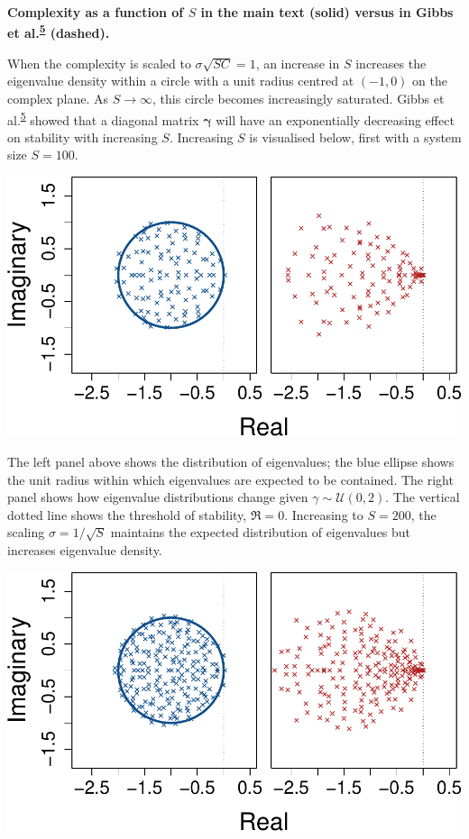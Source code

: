 \documentclass[]{article}
\begin{document}
\textbf{Complexity as a function of \(S\) in the main text (solid)
versus in Gibbs et
al.\textsuperscript{\protect\hyperlink{ref-Gibbs2017}{5}} (dashed).}

When the complexity is scaled to \(\sigma\sqrt{SC} = 1\), an increase in
\(S\) increases the eigenvalue density within a circle with a unit
radius centred at \((-1, 0)\) on the complex plane. As \(S \to \infty\),
this circle becomes increasingly saturated. Gibbs et
al.\textsuperscript{\protect\hyperlink{ref-Gibbs2017}{5}} showed that a
diagonal matrix \(\mathbf{\gamma}\) will have an exponentially
decreasing effect on stability with increasing \(S\). Increasing \(S\)
is visualised below, first with a system size \(S = 100\).

\includegraphics{SI_files/figure-latex/unnamed-chunk-30-1.pdf}

The left panel above shows the distribution of eigenvalues; the blue
ellipse shows the unit radius within which eigenvalues are expected to
be contained. The right panel shows how eigenvalue distributions change
given \(\gamma \sim \mathcal{U}(0,2)\). The vertical dotted line shows
the threshold of stability, \(\Re = 0\). Increasing to \(S = 200\), the
scaling \(\sigma = 1 / \sqrt{S}\) maintains the expected distribution of
eigenvalues but increases eigenvalue density.

\includegraphics{SI_files/figure-latex/unnamed-chunk-31-1.pdf}
\end{document}

